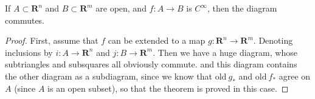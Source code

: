 \begin{lemma}
    If $A \subset \mathbf{R}^n$ and $B \subset \mathbf{R}^m$ are open, and $f: A \to B$ is $C^\infty$, then the diagram
    commutes.
\end{lemma}
\begin{proof}
    First, assume that $f$ can be extended to a map $g: \mathbf{R}^n \to \mathbf{R}^m$. Denoting inclusions by $i: A \to \mathbf{R}^n$ and $j : B \to \mathbf{R}^m$. Then we have a huge diagram, whose subtriangles and subsquares all obviously commute.
    and this diagram contains the other diagram as a subdiagram, since we know that $\text{old}\ g_*$ and $\text{old}\ f_*$ agree on $A$ (since $A$ is an open subset), so that the theorem is proved in this case.


\end{proof}

